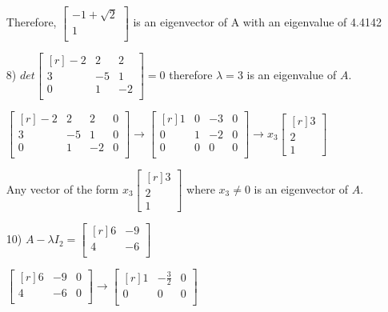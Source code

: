 \documentclass{article}
\begin{document}
\begin{enumerate}
    Therefore, $\begin{bmatrix*}
      -1 + \sqrt{2} \\
      1 \\
    \end{bmatrix*}$ is an eigenvector of A with an 
    eigenvalue of 4.4142

  \item[8)]
    $det\begin{bmatrix*}[r]
      -2 & 2 & 2 \\
      3 & -5 & 1 \\
      0 & 1 & -2 \\
    \end{bmatrix*} = 0$ therefore $\lambda = 3$ is an 
    eigenvalue of $A$. 
    
    $\begin{bmatrix*}[r]
      -2 & 2 & 2 & 0\\
      3 & -5 & 1 & 0\\
      0 & 1 & -2 & 0\\
    \end{bmatrix*} \rightarrow \begin{bmatrix*}[r]
      1 & 0 & -3 & 0\\
      0 & 1 & -2 & 0\\
      0 & 0 & 0 & 0\\
    \end{bmatrix*} \rightarrow
    x_3\begin{bmatrix*}[r]
      3 \\ 2 \\ 1 
    \end{bmatrix*}$

    Any vector of the form $x_3\begin{bmatrix*}[r]
      3 \\ 2 \\ 1 
    \end{bmatrix*}$ where $x_3 \neq 0$ is an eigenvector of
    $A$.

  \item[10)]
    $A - \lambda I_2 = \begin{bmatrix*}[r]
      6 & -9 \\
      4 & -6 \\
    \end{bmatrix*}$

    $\begin{bmatrix*}[r]
      6 & -9 & 0\\
      4 & -6 & 0\\
    \end{bmatrix*} \rightarrow \begin{bmatrix*}[r]
      1 & -\frac{3}{2} & 0\\
      0 & 0 & 0\\
    \end{bmatrix*}$


\end{enumerate}
\end{document}
